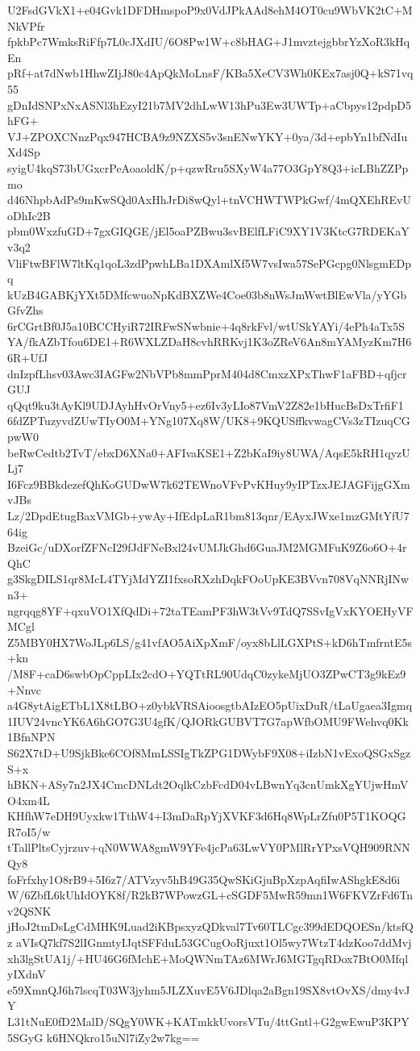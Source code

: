 U2FsdGVkX1+e04Gvk1DFDHmspoP9x0VdJPkAAd8ehM4OT0cu9WbVK2tC+MNkVPfr
fpkbPc7WmksRiFfp7L0cJXdIU/6O8Pw1W+c8bHAG+J1mvztejgbbrYzXoR3kHqEn
pRf+at7dNwb1HhwZIjJ80c4ApQkMoLnsF/KBa5XeCV3Wh0KEx7asj0Q+kS71vq55
gDnIdSNPxNxASNl3hEzyI21b7MV2dhLwW13hPu3Ew3UWTp+aCbpys12pdpD5hFG+
VJ+ZPOXCNnzPqx947HCBA9z9NZXS5v3snENwYKY+0ya/3d+epbYn1bfNdIuXd4Sp
syigU4kqS73bUGxcrPeAoaoldK/p+qzwRru5SXyW4a77O3GpY8Q3+icLBhZZPpmo
d46NhpbAdPs9mKwSQd0AxHhJrDi8wQyl+tnVCHWTWPkGwf/4mQXEhREvUoDhIc2B
pbm0WxzfuGD+7gxGIQGE/jEl5oaPZBwu3svBElfLFiC9XY1V3KtcG7RDEKaYv3q2
VliFtwBFlW7ltKq1qoL3zdPpwhLBa1DXAmlXf5W7vsIwa57SePGcpg0NlsgmEDpq
kUzB4GABKjYXt5DMfcwuoNpKdBXZWe4Coe03b8nWsJmWwtBlEwVla/yYGbGfvZhs
6rCGrtBf0J5a10BCCHyiR72IRFwSNwbnie+4q8rkFvl/wtUSkYAYi/4ePh4aTx5S
YA/fkAZbTfou6DE1+R6WXLZDaH8cvhRRKvj1K3oZReV6An8mYAMyzKm7H66R+UfJ
dnIzpfLhsv03Awc3IAGFw2NbVPb8mmPprM404d8CmxzXPxThwF1aFBD+qfjcrGUJ
qQqt9ku3tAyKl9UDJAyhHvOrVny5+ez6Iv3yLIo87VmV2Z82e1bHucBsDxTrfiF1
6fdZPTuzyvdZUwTIyO0M+YNg107Xq8W/UK8+9KQUSffkvwagCVs3zTIzuqCGpwW0
beRwCedtb2TvT/ebxD6XNa0+AFIvaKSE1+Z2bKaI9iy8UWA/AqsE5kRH1qyzULj7
I6Fcz9BBkdezefQhKoGUDwW7k62TEWnoVFvPvKHuy9yIPTzxJEJAGFijgGXmvJBs
Lz/2DpdEtugBaxVMGb+ywAy+IfEdpLaR1bm813qnr/EAyxJWxe1mzGMtYfU764ig
BzeiGc/uDXorfZFNcI29fJdFNeBxl24vUMJkGhd6GuaJM2MGMFuK9Z6o6O+4rQhC
g3SkgDILS1qr8McL4TYjMdYZI1fxsoRXzhDqkFOoUpKE3BVvn708VqNNRjINwn3+
ngrqqg8YF+qxuVO1XfQdDi+72taTEamPF3hW3tVv9TdQ7SSvIgVxKYOEHyVFMCgl
Z5MBY0HX7WoJLp6LS/g41vfAO5AiXpXmF/oyx8bLlLGXPtS+kD6hTmfrntE5s+kn
/M8F+caD6swbOpCppLIx2cdO+YQTtRL90UdqC0zykeMjUO3ZPwCT3g9kEz9+Nnvc
a4G8ytAigETbL1X8tLBO+z0ybkVRSAioosgtbAIzEO5pUixDuR/tLaUgaea3Igmq
1IUV24vncYK6A6hGO7G3U4gfK/QJORkGUBVT7G7apWfbOMU9FWehvq0Kk1BfnNPN
S62X7tD+U9SjkBke6COf8MmLSSIgTkZPG1DWybF9X08+iIzbN1vExoQSGxSgzS+x
hBKN+ASy7n2JX4CmcDNLdt2OqlkCzbFcdD04vLBwnYq3cnUmkXgYUjwHmVO4xm4L
KHfhW7eDH9Uyxkw1TthW4+I3mDaRpYjXVKF3d6Hq8WpLrZfu0P5T1KOQGR7oI5/w
tTallPltsCyjrzuv+qN0WWA8gmW9YFe4jcPa63LwVY0PMlRrYPxsVQH909RNNQy8
foFrfxhy1O8rB9+5I6z7/ATVzyv5hB49G35QwSKiGjuBpXzpAqfiIwAShgkE8d6i
W/6ZbfL6kUhIdOYK8f/R2kB7WPowzGL+cSGDF5MwR59mn1W6FKVZrFd6Tnv2QSNK
jHoJ2tmDsLgCdMHK9Luad2iKBpsxyzQDkval7Tv60TLCgc399dEDQOESn/ktsfQz
aVIsQ7kf7S2lIGnmtyIJqtSFFduL53GCugOoRjuxt1Ol5wy7WtzT4dzKoo7ddMvj
xh3lgStUA1j/+HU46G6fMchE+MoQWNmTAz6MWrJ6MGTgqRDox7BtO0MfqlyIXdnV
e59XmnQJ6h7lscqT03W3jyhm5JLZXuvE5V6JDlqa2aBgn19SX8vtOvXS/dmy4vJY
L31tNuE0fD2MalD/SQgY0WK+KATmkkUvorsVTu/4ttGntl+G2gwEwuP3KPY5SGyG
k6HNQkro15uNl7iZy2w7kg==
